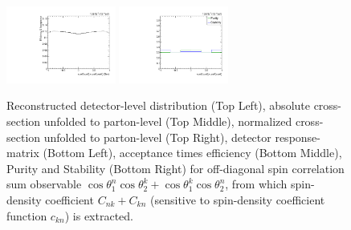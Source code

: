 \begin{figure}[htb]
\begin{center}
 \includegraphics[width=0.32\textwidth]{fig_fullRun2UL/unfolding/combined/TotEff_c_Pnk.pdf}
 \includegraphics[width=0.32\textwidth]{fig_fullRun2UL/unfolding/combined/PurStab_c_Pnk.pdf} \\
\caption{Reconstructed detector-level distribution (Top Left), absolute cross-section unfolded to parton-level (Top Middle), normalized cross-section unfolded to parton-level (Top Right), detector response-matrix (Bottom Left), acceptance times efficiency (Bottom Middle), Purity and Stability (Bottom Right) for off-diagonal spin correlation sum observable $\cos\theta_{1}^{n}\cos\theta_{2}^{k}+\cos\theta_{1}^{k}\cos\theta_{2}^{n}$, from which spin-density coefficient $C_{nk}+C_{kn}$ (sensitive to spin-density coefficient function $c_{k n}$) is extracted.}
\label{fig:c_Pnk}
\end{center}
\end{figure}
\clearpage
